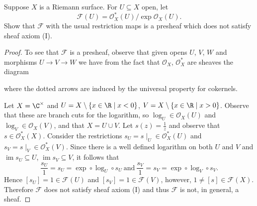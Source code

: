 \documentclass[10pt]{amsart}
\begin{document}
\begin{thm}
  Suppose $X$ is a Riemann surface.
  For $U \subseteq X$ open, let
  $$\mathscr{F}(U) = \mathcal{O}_X^*(U)/\exp \mathcal{O}_X(U).$$
  Show that $\mathscr{F}$ with the usual restriction maps is a presheaf which does not satisfy sheaf axiom (I).
  
  \begin{proof}
    To see that $\mathscr{F}$ is a presheaf, observe that given opens $U$, $V$, $W$ and morphisms $U \rightarrow V \rightarrow W$ we have from the fact that $\mathcal{O}_X$, $\mathcal{O}_X^*$ are sheaves the diagram
    \begin{center}
    \end{center}
    where the dotted arrows are induced by the universal property for cokernels.

    Let $X = \C^\times$ and $U = X \setminus \left\{ x \in \R \;\middle\vert\; x < 0\right\}$, $V = X \setminus \left\{ x \in \R \;\middle\vert\; x > 0\right\}$.
    Observe that these are branch cuts for the logarithm, so $\log_U \in \mathcal{O}_X(U)$ and $\log_V \in \mathcal{O}_X(V)$, and that $X = U \cup V$.
    Let $s(z) = \frac{1}{z}$ and observe that $s \in \mathcal{O}_X^*(X)$.
    Consider the restrictions $s_U = s\mid_U \in \mathcal{O}_X^*(U)$ and $s_V = s\mid_V \in \mathcal{O}_X^*(V)$.
    Since there is a well defined logarithm on both $U$ and $V$ and $\operatorname{im} s_U \subseteq U$, $\operatorname{im} s_V \subseteq V$, it follows that%
    $$\frac{s_U}{1} = s_U = \exp \circ \log_U \circ s_U\ \text{and}\ \frac{s_V}{1} = s_V = \exp \circ \log_V \circ s_V.$$
    Hence $[s_U] = 1 \in \mathscr{F}(U)$ and $[s_V] = 1 \in \mathscr{F}(V)$, however, $1 \neq [s] \in \mathscr{F}(X)$.
    Therefore $\mathscr{F}$ does not satisfy sheaf axiom (I) and thus $\mathscr{F}$ is not, in general, a sheaf.
  \end{proof}
\end{thm}
\end{document}
